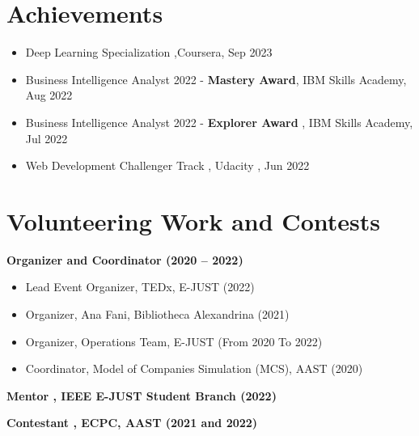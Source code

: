 \documentclass[letterpaper,11pt]{article}
\newcommand{\resumeItem}[1]{
  \item\small{
    {#1 \vspace{-2pt}}
  }
}
\newcommand{\resumeItemListStart}{\begin{itemize}}
\newcommand{\resumeItemListEnd}{\end{itemize}\vspace{-5pt}}
\begin{document}

\section{Achievements}
    \resumeItemListStart
                 \resumeItem{Deep Learning Specialization ,Coursera, Sep 2023}
                \resumeItem{Business Intelligence Analyst 2022 - \textbf{Mastery Award}, IBM Skills Academy, Aug 2022}
                \resumeItem{Business Intelligence Analyst 2022 - \textbf{Explorer Award} , IBM Skills Academy, Jul 2022}
                \resumeItem{{Web Development Challenger Track} {, Udacity} {, Jun 2022}  }
\resumeItemListEnd



        

    
\section{Volunteering Work and Contests}

\textbf{{Organizer and Coordinator} {(2020 -- 2022)}}{}{}
    \resumeItemListStart
        \resumeItem{Lead Event Organizer, TEDx, E-JUST (2022)}
        \resumeItem{Organizer, Ana Fani, Bibliotheca Alexandrina (2021)}
        \resumeItem{Organizer, Operations Team, E-JUST (From 2020 To 2022)}
        \resumeItem{Coordinator, Model of Companies Simulation (MCS), AAST (2020)}
\resumeItemListEnd
    
    \textbf{{Mentor} {, IEEE E-JUST Student Branch}{} {(2022)}}  
    
    \textbf{{Contestant} {, ECPC, AAST} {} {(2021 and 2022)} }


    
\end{document}
